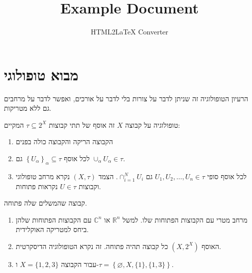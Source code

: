 \documentclass{tstextbook}
\begin{document}
\title{Example Document}
\author{HTML2LaTeX Converter}
\maketitle


\section{מבוא טופולוגי}

הרעיון הטופולוגיה זה שניתן לדבר על צורות בלי לדבר על אורכים, ואפשר לדבר על מרחבים גם ללא מטריקות.

\begin{definition}[טופולוגיה]
טופולוגיה על קבוצה \(X\) זה אוסף של תתי קבוצות \(\tau \subseteq 2^{X}\) המקיים:

  \begin{enumerate}
    \item הקבוצה הריקה והקבוצה כולה בפנים 


    \item לכל אוסף \(\left\{  U_{\alpha}  \right\}_{\alpha}\subseteq \tau\) גם \(\cup_{\alpha}U_{\alpha}\in \tau\). 


    \item לכל אוסף סופי \(U_{1},U_{2},\dots,U_{n}\in \tau\) גם \(\cap_{i=1}^{N}U_{i}\). 
הצמד \(\left( X,\tau \right)\) נקרא מרחב טופולוגי וקבוצות \(U \in \tau\) נקראות פתוחות.


  \end{enumerate}
\end{definition}
\begin{definition}
קבוצה שהמשלים שלה פתוחה.

\end{definition}
\begin{example}
  \begin{enumerate}
    \item מרחב מטרי עם הקבוצות הפתוחות שלו. למשל \(\mathbb{R}^{n}\) או \(\mathbb{C}^{n}\) עם הקבוצות הפתוחות שלהן ביחס למטריקה האוקלידית. 


    \item האוסף \((X,2^{X})\) כל קבוצה תהיה פתוחה. זה נקרא הטופולוגיה הדיסקרטית. 


    \item עבור הקבוצה \(X=\{ 1,2,3 \}\) ו-\(\tau=\left\{  \varnothing,X,\{ 1 \},\{ 1,3 \}  \right\}\). 


  \end{enumerate}
\end{example}
\end{document}
